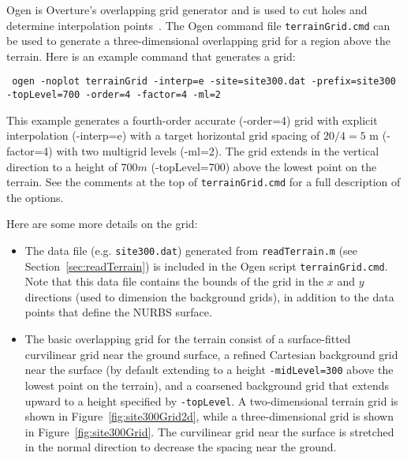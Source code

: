 \documentclass[11pt]{article}
\begin{document}
Ogen is Overture's overlapping grid generator and is used to cut holes and determine interpolation
points~\cite{OGEN}.
The Ogen command file {\tt terrainGrid.cmd} can be used to generate a three-dimensional
overlapping grid for a region above the terrain.   
Here is an example command that generates a grid:
\begin{flushleft}\tt
   ogen -noplot terrainGrid -interp=e -site=site300.dat -prefix=site300  -topLevel=700 -order=4 -factor=4 -ml=2
\end{flushleft}
This example generates a fourth-order accurate (-order=4) grid with explicit interpolation (-interp=e) with a target horizontal grid
spacing of $20/4=5$ m (-factor=4) with two multigrid levels (-ml=2). The grid extends in the vertical direction to a height
of $700m$ (-topLevel=700) above the lowest point on the terrain. 
See the comments at the top of {\tt terrainGrid.cmd} for a full description of the options.

Here are some more details on the grid:
\begin{itemize}
   \item The data file (e.g. {\tt site300.dat}) generated from {\tt readTerrain.m} (see Section~\ref{sec:readTerrain}) is included
   in the Ogen script {\tt terrainGrid.cmd}. 
   Note that this data file contains the bounds of the grid in the $x$ and $y$ directions (used to dimension the background grids), 
   in addition to the data points that define the NURBS surface. 
   \item The basic overlapping grid for the terrain consist of a surface-fitted 
     curvilinear grid near the ground surface, a refined Cartesian background grid near
     the surface (by default extending to a height {\tt -midLevel=300} above the lowest point on the terrain), 
     and a coarsened background grid that extends upward to a height specified by {\tt -topLevel}.
     A two-dimensional terrain grid is shown in Figure~\ref{fig:site300Grid2d}, while a three-dimensional grid
     is shown in Figure~\ref{fig:site300Grid}.
     The curvilinear grid near the surface is stretched in the normal direction to decrease the spacing near the ground.
\end{itemize}
\end{document}
